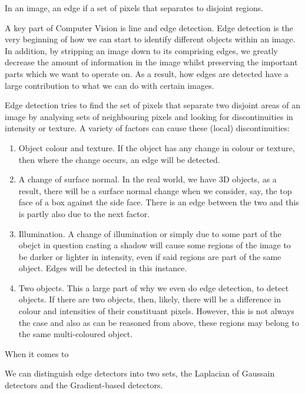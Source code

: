 \documentclass[11pt]{article}
\begin{document}
\begin{center}
	In an image, an edge if a set of pixels that separates to disjoint
	regions.
\end{center}

A key part of Computer Vision is line and edge detection. Edge detection is
the very beginning of how we can start to identify different objects 
within an image. In addition, by stripping an image down to its comprising
edges, we greatly decrease the amount of information in the image whilst
preserving the important parts which we want to operate on. 
As a result, how edges are detected have a large contribution
to what we can do with certain images.  

Edge detection tries to find the set of pixels that separate two 
disjoint areas of an image by analysing sets of neighbouring pixels and 
looking for discontinuities in intensity or texture. A variety of factors
can cause these (local) discontinuities:
\begin{enumerate}
	\item Object colour and texture. If the object has any change in colour or
		  texture, then where the change occurs, an edge will be detected.
	\item A change of surface normal. In the real world, we have 3D objects,
		  as a result, there will be a surface normal change when we consider,
		  say, the top face of a box against the side face. There is an edge
		  between the two and this is partly also due to the next factor.
	\item Illumination. A change of illumination or simply due to some
		  part of the obejct in question casting a shadow will cause some regions
		  of the image to be darker or lighter in intensity, even if said
		  regions are part of the same object. Edges will be detected in this
		  instance.
	\item Two objects. This a large part of why we even do edge detection, to
		  detect objects. If there are two objects, then, likely, there will be
		  a difference in colour and intensities of their constituant pixels.
		  However, this is not always the case and also as can be reasoned from
		  above, these regions may belong to the same multi-coloured object.
\end{enumerate}

When it comes to 

We can distinguish edge detectors into two sets, the Laplacian of Gaussain detectors
and the Gradient-based detectors.
\end{document}
